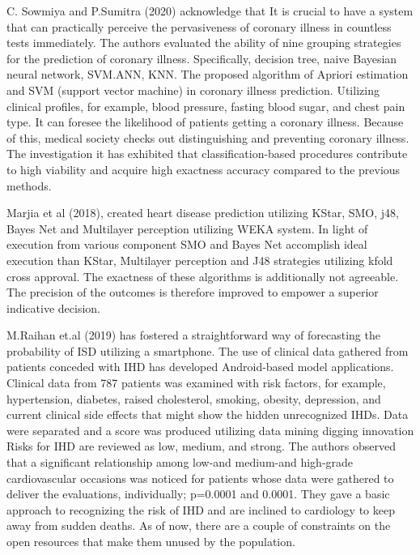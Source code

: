 C. Sowmiya and P.Sumitra (2020) acknowledge that It is crucial to have a system that can practically perceive the pervasiveness of coronary illness in countless tests immediately. The authors evaluated the ability of nine grouping strategies for the prediction of coronary illness. Specifically, decision tree, naive Bayesian neural network, SVM.ANN, KNN. The proposed algorithm of Apriori estimation and SVM (support vector machine) in coronary illness prediction. Utilizing clinical profiles, for example, blood pressure, fasting blood sugar, and chest pain type. It can foresee the likelihood of patients getting a coronary illness. Because of this, medical society checks out distinguishing and preventing coronary illness. The investigation it has exhibited that classification-based procedures contribute to high viability and acquire high exactness accuracy compared to the previous methods.

Marjia et al (2018), created heart disease prediction utilizing KStar, SMO, j48, Bayes Net and Multilayer perception utilizing WEKA system. In light of execution from various component SMO and Bayes Net accomplish ideal execution than KStar, Multilayer perception and J48 strategies utilizing kfold cross approval. The exactness of these algorithms is additionally not agreeable. The precision of the outcomes is therefore improved to empower a superior indicative decision.

M.Raihan et.al (2019) has fostered a straightforward way of forecasting the probability of ISD utilizing a smartphone. The use of clinical data gathered from patients conceded with IHD has developed Android-based model applications. Clinical data from 787 patients was examined with risk factors, for example, hypertension, diabetes, raised cholesterol, smoking, obesity, depression, and current clinical side effects that might show the hidden unrecognized  IHDs. Data were separated and a score was produced utilizing data mining digging innovation Risks for IHD are reviewed as low, medium, and strong. The authors observed that a significant relationship among low-and medium-and high-grade cardiovascular occasions was noticed for patients whose data were gathered to deliver the evaluations, individually; p=0.0001 and 0.0001. They gave a basic approach to recognizing the risk of IHD and are inclined to cardiology to keep away from sudden deaths. As of now, there are a couple of constraints on the open resources that make them unused by the population.

